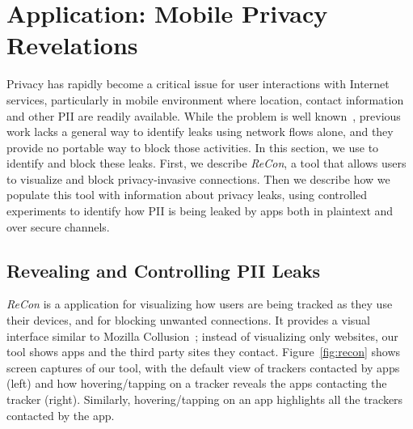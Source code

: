 \section{Application: Mobile Privacy\\ Revelations}
\label{sec:characterize-app}


Privacy has rapidly become a critical issue for user interactions with Internet services, particularly in 
mobile environment where location, contact information and other PII are readily available. While the problem 
is well known~\cite{roesner:webtrackers,leontiadis:mobileads,vallina-rod:ads}, previous work lacks a general 
way to identify leaks using network flows alone, and they provide no portable way to block those 
activities. In this section, we use \meddle to identify and block these leaks. First, we describe \emph{ReCon}, 
a tool that allows users to visualize and block privacy-invasive connections. Then we describe how we populate 
this tool with information about privacy leaks, using controlled experiments to identify how PII is being leaked by apps  
 both in plaintext and over secure channels. 

\subsection{Revealing and Controlling PII Leaks}
\label{subsec:recon}

\emph{ReCon} is a \meddle application for visualizing how users are being tracked as they 
use their devices, and for blocking unwanted connections.
It provides a visual interface similar to Mozilla Collusion~\cite{collusion}; instead of 
visualizing only websites, our tool shows apps and the third party sites they contact. 
Figure~\ref{fig:recon} shows screen captures of our tool, with the default view of trackers contacted by apps (left) and how 
hovering/tapping on a tracker reveals the apps contacting the tracker (right). Similarly, hovering/tapping on an app 
highlights all the trackers contacted by the app.

